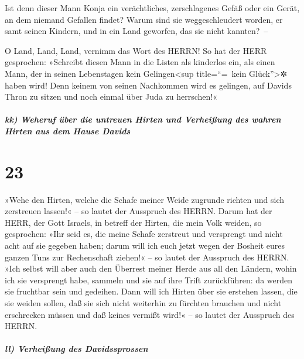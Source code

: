 Ist denn dieser Mann Konja ein verächtliches,
zerschlagenes Gefäß oder ein Gerät, an dem niemand Gefallen findet?
Warum sind sie weggeschleudert worden, er samt seinen Kindern, und in
ein Land geworfen, das sie nicht kannten?~--

O Land, Land, Land, vernimm das Wort des HERRN!
So hat der HERR gesprochen: »Schreibt diesen Mann in die
Listen als kinderlos ein, als einen Mann, der in seinen Lebenstagen kein
Gelingen\textless sup title=``=~kein Glück''\textgreater✲ haben wird!
Denn keinem von seinen Nachkommen wird es gelingen, auf Davids Thron zu
sitzen und noch einmal über Juda zu herrschen!«

\hypertarget{kk-weheruf-uxfcber-die-untreuen-hirten-und-verheiuxdfung-des-wahren-hirten-aus-dem-hause-davids}{%
\subparagraph{kk) Weheruf über die untreuen Hirten und Verheißung des
wahren Hirten aus dem Hause
Davids}\label{kk-weheruf-uxfcber-die-untreuen-hirten-und-verheiuxdfung-des-wahren-hirten-aus-dem-hause-davids}}

\hypertarget{section-22}{%
\section{23}\label{section-22}}

»Wehe den Hirten, welche die Schafe meiner Weide zugrunde
richten und sich zerstreuen lassen!« -- so lautet der Ausspruch des
HERRN. Darum hat der HERR, der Gott Israels, in betreff
der Hirten, die mein Volk weiden, so gesprochen: »Ihr seid es, die meine
Schafe zerstreut und versprengt und nicht acht auf sie gegeben haben;
darum will ich euch jetzt wegen der Bosheit eures ganzen Tuns zur
Rechenschaft ziehen!« -- so lautet der Ausspruch des HERRN.
»Ich selbst will aber auch den Überrest meiner Herde aus
all den Ländern, wohin ich sie versprengt habe, sammeln und sie auf ihre
Trift zurückführen: da werden sie fruchtbar sein und gedeihen.
Dann will ich Hirten über sie erstehen lassen, die sie
weiden sollen, daß sie sich nicht weiterhin zu fürchten brauchen und
nicht erschrecken müssen und daß keines vermißt wird!« -- so lautet der
Ausspruch des HERRN.

\hypertarget{ll-verheiuxdfung-des-davidssprossen}{%
\subparagraph{ll) Verheißung des
Davidssprossen}\label{ll-verheiuxdfung-des-davidssprossen}}

